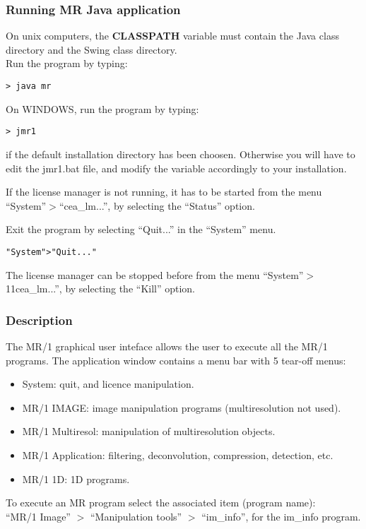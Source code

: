 \subsubsection*{Running MR Java application}

On unix computers, the {\bf CLASSPATH} variable must contain the Java class 
directory and the Swing class directory. \\ 
Run the program by typing:
\begin{verbatim}
> java mr
\end{verbatim}

On WINDOWS, run the program by typing:
\begin{verbatim}
> jmr1
\end{verbatim}
if the default installation directory has been choosen. Otherwise you
will have to edit the jmr1.bat file, and modify the variable accordingly
to your installation.

If the license manager is not running, it has to be started from the 
menu ``System''$>$``cea\_lm...'', by selecting the ``Status'' option.


Exit the program by selecting ``Quit...'' in the ``System'' menu.
\begin{verbatim}
"System">"Quit..."
\end{verbatim}
The license manager can be stopped before from the 
menu ``System''$>$11cea\_lm...'', by selecting the ``Kill'' option.

\subsubsection*{Description}

The MR/1 graphical user inteface allows the user to execute all the MR/1  
programs.
The application window contains a menu bar with 5 tear-off menus: 
\begin{itemize}
\item System: quit, and licence manipulation.
\item MR/1 IMAGE: image manipulation programs (multiresolution not used).
\item MR/1 Multiresol: manipulation of multiresolution objects.
\item MR/1 Application: filtering, deconvolution, compression, detection, etc.
\item MR/1 1D: 1D programs.
\end{itemize}
To execute an MR program select the associated item (program name): \\
``MR/1 Image'' $>$ ``Manipulation tools'' $>$ ``im\_info'', 
for the im\_info program.  

